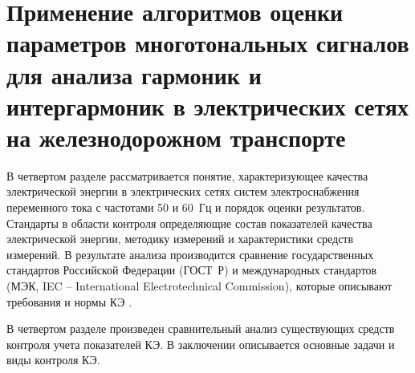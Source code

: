 %
%

\chapter{Применение алгоритмов оценки параметров многотональных сигналов для анализа гармоник и интергармоник в электрических сетях на железнодорожном транспорте}\label{ch:ch4}

В четвертом разделе рассматривается понятие, характеризующее качества электрической энергии в электрических сетях систем электроснабжения переменного тока с частотами 50 и 60~Гц и порядок оценки результатов. Стандарты в области контроля определяющие состав показателей качества электрической энергии, методику измерений и характеристики средств измерений. В результате анализа производится сравнение государственных стандартов Российской Федерации (ГОСТ~Р) и международных стандартов (МЭК, IEC -- International Electrotechnical Commission), которые описывают требования и нормы КЭ \cite{IEC}.

В четвертом разделе произведен сравнительный анализ существующих средств контроля учета показателей КЭ. В заключении описывается основные задачи и виды контроля КЭ.

